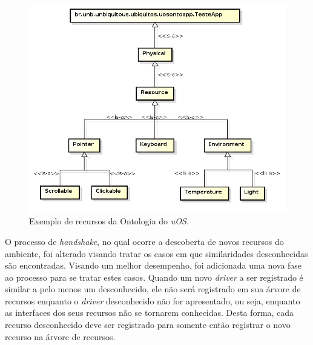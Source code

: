 \begin{figure}[ht]
	\center
	\includegraphics[scale=0.7]{imagens/ontologia}
	\caption{Exemplo de recursos da Ontologia do \emph{uOS}.}
	\label{fig:ontologiaUOS}
\end{figure}

O processo de \emph{handshake}, no qual ocorre a descoberta de novos recursos do ambiente, foi alterado visando tratar os casos em que similaridades desconhecidas são encontradas. Visando um melhor desempenho, foi adicionada uma nova fase ao processo para se tratar estes casos. Quando um novo \emph{driver} a ser registrado é similar a pelo menos um desconhecido, ele não será registrado em sua árvore de recursos enquanto o \emph{driver} desconhecido não for apresentado, ou seja, enquanto as interfaces dos seus recursos não se tornarem conhecidas. Desta forma, cada recurso desconhecido deve ser registrado para somente então registrar o novo recurso na árvore de recursos.
